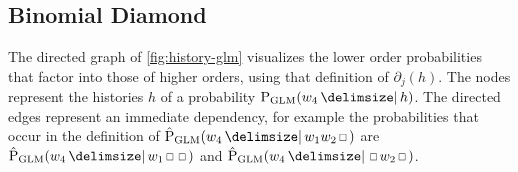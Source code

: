 \subsection{Binomial Diamond}


The directed graph of \cref{fig:history-glm} visualizes the lower order
probabilities that factor into those of higher orders, using that definition of
$\partial_j(h)$.
The nodes represent the histories $h$ of a probability $\ProbGLM{w_4}{h}$.
The directed edges represent an immediate dependency, for example the
probabilities that occur in the definition of
$\ProbGLM*{w_4}{w_1 w_2 \Skp}$ are $\ProbGLM*{w_4}{w_1 \Skp \Skp}$ and
$\ProbGLM*{w_4}{\Skp w_2 \Skp}$.

